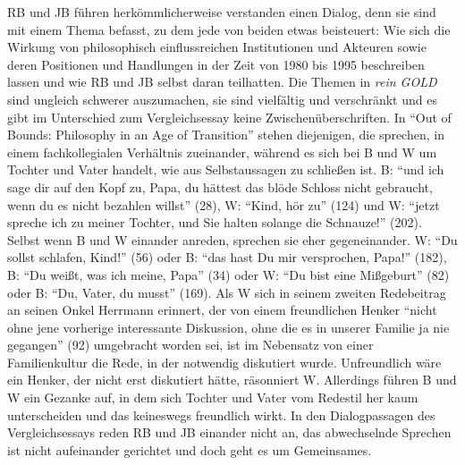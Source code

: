 \documentclass[fontsize=12pt]{scrartcl}
\begin{document}
RB und JB f\"uhren herk\"ommlicherweise verstanden einen Dialog, denn sie sind mit einem Thema befasst, zu dem jede\textsuperscript{\tiny *} von beiden etwas beisteuert: Wie sich die Wirkung von philosophisch einflussreichen Institutionen und Akteuren\textsuperscript{\tiny *} sowie deren Positionen und Handlungen in der Zeit von 1980 bis 1995 beschrei\-ben lassen und wie RB und JB \mbox{selbst} daran teilhatten. Die Themen in \textit{rein GOLD} sind un\-gleich schwe\-rer auszumachen, sie sind vielf\"altig und verschr\"ankt und es gibt im Unterschied zum Vergleichsessay keine Zwischen\"uberschriften. In "`Out of Bounds: Philosophy in an Age of Transition"' stehen diejenigen, die sprechen, in einem fachkollegialen Verh\"altnis zueinander, w\"ahrend es sich bei B und W um Tochter und Vater handelt, wie aus \mbox{Selbst}\-aussagen zu schlie{\ss}en ist. B: "`und ich sage dir auf den Kopf zu, Papa, du h\"attest das bl\"ode Schloss nicht gebraucht, wenn du es nicht bezahlen willst"' (28), W: "`Kind, h\"or zu"' (124) und W: "`jetzt spreche ich zu meiner Tochter, und Sie halten solange die Schnauze!"' (202). \mbox{Selbst} wenn B und W einander anreden, sprechen sie eher gegeneinander. W: "`Du sollst schlafen, Kind!"' (56) oder B: "`das hast Du mir versprochen, Papa!"' (182), B: "`Du wei{\ss}t, was ich meine, Papa"' (34) oder W: "`Du bist eine Mi{\ss}geburt"' (82) oder B: "`Du, Vater, du musst"' (169). Als W sich in seinem zwei\-ten Redebeitrag an seinen Onkel Herrmann erinnert, der von einem freundlichen Henker "`nicht ohne jene vorherige interessante Dis\-kus\-si\-on, ohne die es in unserer Familie ja nie gegangen"' (92) umgebracht worden sei, ist im Nebensatz von einer Familienkultur die Rede, in der notwendig diskutiert wurde. Unfreundlich w\"are ein Henker, der nicht erst diskutiert h\"atte, r\"asonniert W. Al\-ler\-dings f\"uhren B und W ein Gezanke auf, in dem sich Tochter und Vater vom Redestil her kaum unterscheiden und das keineswegs freundlich wirkt. In den Dialogpassagen des Vergleichsessays reden RB und JB einander nicht an, das abwechselnde Sprechen ist nicht aufeinander gerichtet und doch geht es um Gemeinsames.
\end{document}
